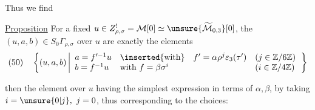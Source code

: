 Thus we find

\uline{Proposition}
For a fixed \(u\in Z_{\rho,\sigma}^{!}=\mathcal M[0]
\simeq\unsure{\widetilde{\mathcal M}_{0,3}}[0]\),
the \((u,a,b)\in S_0\Gamma_{\rho,\sigma}\) over \(u\)
are exactly the elements 
\[
(50)\quad
\left\{(u,a,b)\left|\begin{array}{lll}
a=f'^{-1}u&\inserted{\text{with}}\quad
 f'=\alpha\rho^j\varepsilon_3(\tau')&(j\in\mathbb Z/6\mathbb Z)\\
b=f^{-1}u&\text{with }f=\beta\sigma^i&(i\in\mathbb Z/4\mathbb Z)
\end{array}\right.\right\}
\]

 then the element
 over \(u\)
having the simplest expression in terms of \(\alpha,\beta\),
by taking \(i=\unsure{0|j},\ j=0\), thus corresponding to the choices:

